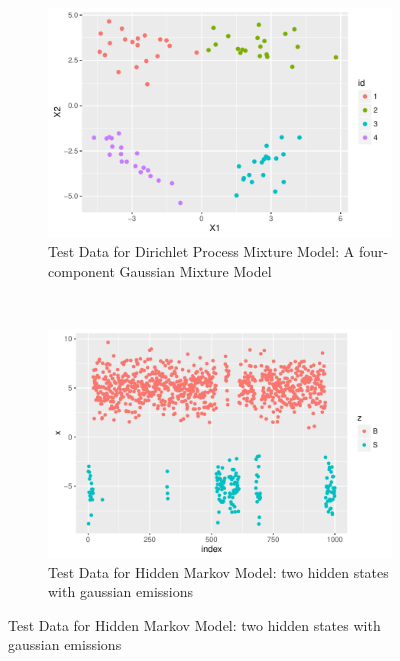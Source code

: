 \documentclass[12pt]{article}
\begin{document}
\begin{figure}[h!]
    \centering
    \begin{subfigure}{0.5\textwidth}
        \centering
        \includegraphics[width = 0.5\linewidth]{plots/gmm.pdf}
        \caption{Test Data for Dirichlet Process Mixture Model: A four-component Gaussian Mixture Model}
        \label{fig:1a}
    \end{subfigure}%
    ~ 
    \begin{subfigure}{0.5\textwidth}
        \centering
        \includegraphics[width = 0.5\linewidth]{plots/hmm.pdf}
        \caption{Test Data for Hidden Markov Model: two hidden states with gaussian emissions}
        \label{fig:1b}        
    \end{subfigure}%
    

\end{figure}
\end{document}
